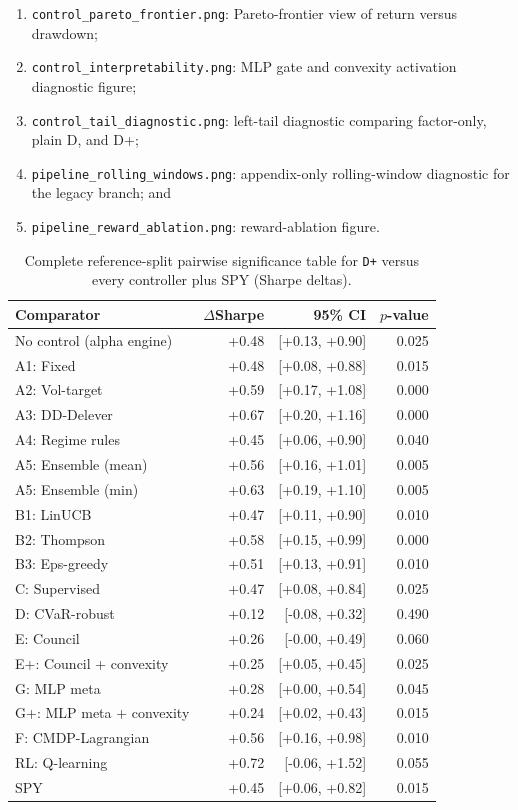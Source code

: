 \documentclass[11pt]{article}
\begin{document}
\begin{enumerate}[leftmargin=1.5em, itemsep=2pt, topsep=4pt]
\item \texttt{control\_pareto\_frontier.png}: Pareto-frontier view of return versus drawdown;
\item \texttt{control\_interpretability.png}: MLP gate and convexity activation diagnostic figure;
\item \texttt{control\_tail\_diagnostic.png}: left-tail diagnostic comparing factor-only, plain D, and D+;
\item \texttt{pipeline\_rolling\_windows.png}: appendix-only rolling-window diagnostic for the legacy branch; and
\item \texttt{pipeline\_reward\_ablation.png}: reward-ablation figure.
\end{enumerate}


\begin{table}[t]
\centering
\small
\caption{Complete reference-split pairwise significance table for \texttt{D+} versus every controller plus SPY (Sharpe deltas).}
\label{tab:dplus_significance_full}
\begin{tabular}{@{} l r r r @{}}
\toprule
\textbf{Comparator} & \textbf{$\Delta$Sharpe} & \textbf{95\% CI} & \textbf{$p$-value} \\
\midrule
No control (alpha engine) & +0.48 & [+0.13, +0.90] & 0.025 \\
A1: Fixed & +0.48 & [+0.08, +0.88] & 0.015 \\
A2: Vol-target & +0.59 & [+0.17, +1.08] & 0.000 \\
A3: DD-Delever & +0.67 & [+0.20, +1.16] & 0.000 \\
A4: Regime rules & +0.45 & [+0.06, +0.90] & 0.040 \\
A5: Ensemble (mean) & +0.56 & [+0.16, +1.01] & 0.005 \\
A5: Ensemble (min) & +0.63 & [+0.19, +1.10] & 0.005 \\
B1: LinUCB & +0.47 & [+0.11, +0.90] & 0.010 \\
B2: Thompson & +0.58 & [+0.15, +0.99] & 0.000 \\
B3: Eps-greedy & +0.51 & [+0.13, +0.91] & 0.010 \\
C: Supervised & +0.47 & [+0.08, +0.84] & 0.025 \\
D: CVaR-robust & +0.12 & [-0.08, +0.32] & 0.490 \\
E: Council & +0.26 & [-0.00, +0.49] & 0.060 \\
E+: Council + convexity & +0.25 & [+0.05, +0.45] & 0.025 \\
G: MLP meta & +0.28 & [+0.00, +0.54] & 0.045 \\
G+: MLP meta + convexity & +0.24 & [+0.02, +0.43] & 0.015 \\
F: CMDP-Lagrangian & +0.56 & [+0.16, +0.98] & 0.010 \\
RL: Q-learning & +0.72 & [-0.06, +1.52] & 0.055 \\
SPY & +0.45 & [+0.06, +0.82] & 0.015 \\
\bottomrule
\end{tabular}
\end{table}
\end{document}
